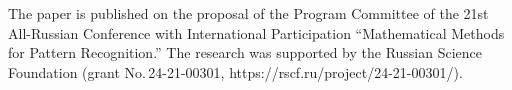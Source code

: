 




\vspace*{-12pt}


    
      \Ack

\vspace*{-3pt}

\noindent
The paper is published on the proposal of the Program Committee of the 21st All-Russian 
Conference with International Participation ``Mathematical Methods for Pattern Recognition.'' 
The research was supported by the Russian Science Foundation (grant  
No.\,24-21-00301, {\sf https://rscf.ru/project/24-21-00301/}). 


